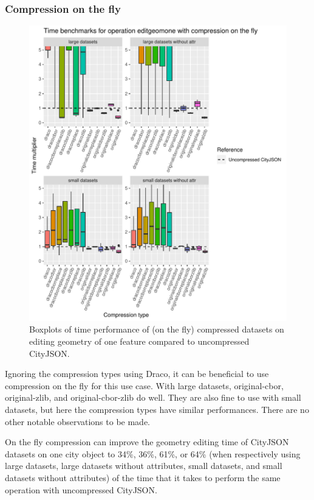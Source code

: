 \clearpage

\subsubsection{Compression on the fly}

\begin{figure}[h!]
    \includegraphics[scale=0.92]{figs/benchmark/individualotf/editgeomone.pdf}
    \caption{Boxplots of time performance of (on the fly) compressed datasets on editing geometry of one feature compared to uncompressed CityJSON.}
    \label{figotf:sdvis}
\end{figure}

Ignoring the compression types using Draco, it can be beneficial to use compression on the fly for this use case.
With large datasets, original-cbor, original-zlib, and original-cbor-zlib do well.
They are also fine to use with small datasets, but here the compression types have similar performances.
There are no other notable observations to be made.

On the fly compression can improve the geometry editing time of CityJSON datasets on one city object to 34\%, 36\%, 61\%, or 64\% (when respectively using large datasets, large datasets without attributes, small datasets, and small datasets without attributes) of the time that it takes to perform the same operation with uncompressed CityJSON.



